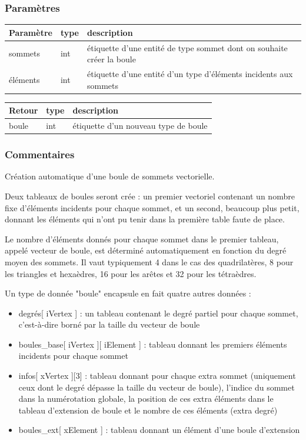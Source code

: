 \documentclass[a4paper,12pt]{article}
\begin{document}
\subsubsection*{Paramètres}

\begin{tabular}{|m{2cm}|m{1.5cm}|m{10.5cm}|}
\hline
Paramètre  & type   & description \\
\hline
sommets     & int    & étiquette d'une entité de type sommet dont on souhaite créer la boule \\
\hline
éléments   & int    & étiquette d'une entité d'un type d'éléments incidents aux sommets \\
\hline
\end{tabular}

\medskip

\begin{tabular}{|m{2cm}|m{1.5cm}|m{10.5cm}|}
\hline
Retour     & type   & description \\
\hline
boule      & int    & étiquette d'un nouveau type de boule \\
\hline
\end{tabular}
\subsubsection*{Commentaires}

Création automatique d'une boule de sommets vectorielle.

Deux tableaux de boules seront crée : un premier vectoriel contenant un nombre fixe d'éléments incidents pour chaque sommet, et un second, beaucoup plus petit, donnant les éléments qui n'ont pu tenir dans la première table faute de place.

Le nombre d'éléments donnés pour chaque sommet dans le premier tableau, appelé vecteur de boule, est déterminé automatiquement en fonction du degré moyen des sommets. Il vaut typiquement 4 dans le cas des quadrilatères, 8 pour les triangles et hexaèdres, 16 pour les arêtes et 32 pour les tétraèdres.

Un type de donnée "boule" encapsule en fait quatre autres données :

\begin{itemize}
\item  degrés[ iVertex ] : un tableau contenant le degré partiel pour chaque sommet, c'est-à-dire borné par la taille du vecteur de boule
\item boules\_base[ iVertex ][ iElement ] : tableau donnant les premiers éléments incidents pour chaque sommet
\item infos[ xVertex ][3] : tableau donnant pour chaque extra sommet (uniquement ceux dont le degré dépasse la taille du vecteur de boule), l'indice du sommet dans la numérotation globale, la position de ces extra éléments dans le tableau d'extension de boule et le nombre de ces éléments (extra degré)
\item boules\_ext[ xElement ] : tableau donnant un élément d'une boule d'extension
\end{itemize}
\end{document}
